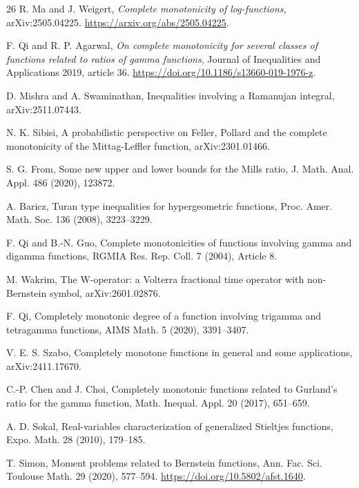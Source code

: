 \documentclass[11pt]{article}
\numberwithin{equation}{section}
\theoremstyle{definition}
\theoremstyle{remark}
\newcommand{\1}{\mathbf 1}
\begin{document}
\begin{thebibliography}{26}
R. Ma and J. Weigert,
\emph{Complete monotonicity of log-functions},
arXiv:2505.04225.
\url{https://arxiv.org/abs/2505.04225}.

F. Qi and R. P. Agarwal,
\emph{On complete monotonicity for several classes of functions related to
ratios of gamma functions},
Journal of Inequalities and Applications 2019, article 36.
\url{https://doi.org/10.1186/s13660-019-1976-z}.


D. Mishra and A. Swaminathan,
\newblock Inequalities involving a Ramanujan integral,
\newblock arXiv:2511.07443.

N. K. Sibisi,
\newblock A probabilistic perspective on Feller, Pollard and the complete
  monotonicity of the Mittag-Leffler function,
\newblock arXiv:2301.01466.

S. G. From,
\newblock Some new upper and lower bounds for the Mills ratio,
\newblock J. Math. Anal. Appl. 486 (2020), 123872.

A. Baricz,
\newblock Turan type inequalities for hypergeometric functions,
\newblock Proc. Amer. Math. Soc. 136 (2008), 3223--3229.

F. Qi and B.-N. Guo,
\newblock Complete monotonicities of functions involving gamma and digamma
  functions,
\newblock RGMIA Res. Rep. Coll. 7 (2004), Article 8.

M. Wakrim,
\newblock The W-operator: a Volterra fractional time operator with
  non-Bernstein symbol,
\newblock arXiv:2601.02876.

F. Qi,
\newblock Completely monotonic degree of a function involving trigamma and
  tetragamma functions,
\newblock AIMS Math. 5 (2020), 3391--3407.

V. E. S. Szabo,
\newblock Completely monotone functions in general and some applications,
\newblock arXiv:2411.17670.

C.-P. Chen and J. Choi,
\newblock Completely monotonic functions related to Gurland's ratio for the
  gamma function,
\newblock Math. Inequal. Appl. 20 (2017), 651--659.

A. D. Sokal,
\newblock Real-variables characterization of generalized Stieltjes functions,
\newblock Expo. Math. 28 (2010), 179--185.

T. Simon,
\newblock Moment problems related to Bernstein functions,
\newblock Ann. Fac. Sci. Toulouse Math. 29 (2020), 577--594.
\url{https://doi.org/10.5802/afst.1640}.


\end{thebibliography}
\end{document}
